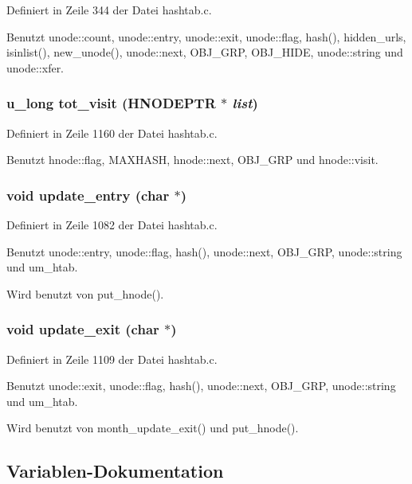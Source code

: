 Definiert in Zeile 344 der Datei hashtab.c.

Benutzt unode::count, unode::entry, unode::exit, unode::flag, hash(), hidden\_\-urls, isinlist(), new\_\-unode(), unode::next, OBJ\_\-GRP, OBJ\_\-HIDE, unode::string und unode::xfer.
\subsubsection{\setlength{\rightskip}{0pt plus 5cm}u\_\-long tot\_\-visit ({\bf HNODEPTR} $\ast$ {\em list})}\label{hashtab_8c_c7baccdb17212972eee28ccc861dd307}




Definiert in Zeile 1160 der Datei hashtab.c.

Benutzt hnode::flag, MAXHASH, hnode::next, OBJ\_\-GRP und hnode::visit.
\subsubsection{\setlength{\rightskip}{0pt plus 5cm}void update\_\-entry (char $\ast$)}\label{hashtab_8c_8017a1f2a1080bd0c9f052305f896b10}




Definiert in Zeile 1082 der Datei hashtab.c.

Benutzt unode::entry, unode::flag, hash(), unode::next, OBJ\_\-GRP, unode::string und um\_\-htab.

Wird benutzt von put\_\-hnode().
\subsubsection{\setlength{\rightskip}{0pt plus 5cm}void update\_\-exit (char $\ast$)}\label{hashtab_8c_7da0915678a706dfa45ec0ae92af2fa2}




Definiert in Zeile 1109 der Datei hashtab.c.

Benutzt unode::exit, unode::flag, hash(), unode::next, OBJ\_\-GRP, unode::string und um\_\-htab.

Wird benutzt von month\_\-update\_\-exit() und put\_\-hnode().

\subsection{Variablen-Dokumentation}
